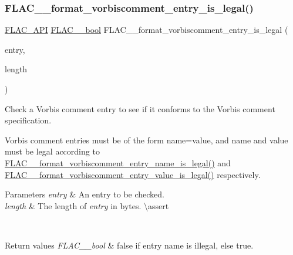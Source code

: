 \subsubsection{\texorpdfstring{FLAC\_\_format\_vorbiscomment\_entry\_is\_legal()}{FLAC\_\_format\_vorbiscomment\_entry\_is\_legal()}}
{\footnotesize\ttfamily \mbox{\hyperlink{group__flac__export_ga56ca07df8a23310707732b1c0007d6f5}{F\+L\+A\+C\+\_\+\+A\+PI}} \mbox{\hyperlink{ordinals_8h_a95103469f1cbd78b8cf250194985b34e}{F\+L\+A\+C\+\_\+\+\_\+bool}} F\+L\+A\+C\+\_\+\+\_\+format\+\_\+vorbiscomment\+\_\+entry\+\_\+is\+\_\+legal (\begin{DoxyParamCaption}\item[{const \mbox{\hyperlink{ordinals_8h_a5eb569b12d5b047cdacada4d57924ee3}{F\+L\+A\+C\+\_\+\+\_\+byte}} $\ast$}]{entry,  }\item[{unsigned}]{length }\end{DoxyParamCaption})}

Check a Vorbis comment entry to see if it conforms to the Vorbis comment specification.

Vorbis comment entries must be of the form \textquotesingle{}name=value\textquotesingle{}, and \textquotesingle{}name\textquotesingle{} and \textquotesingle{}value\textquotesingle{} must be legal according to \mbox{\hyperlink{group__flac__format_ga14980d2e4b0ff2cdd4f22fcf8e75b54c}{F\+L\+A\+C\+\_\+\+\_\+format\+\_\+vorbiscomment\+\_\+entry\+\_\+name\+\_\+is\+\_\+legal()}} and \mbox{\hyperlink{group__flac__format_gae0707c9d46b2af02f1e145bdae331605}{F\+L\+A\+C\+\_\+\+\_\+format\+\_\+vorbiscomment\+\_\+entry\+\_\+value\+\_\+is\+\_\+legal()}} respectively.


\begin{DoxyParams}{Parameters}
{\em entry} & An entry to be checked. \\
\hline
{\em length} & The length of {\itshape entry} in bytes. \textbackslash{}assert 
\begin{DoxyCode}{1}
\end{DoxyCode}
 \\
\hline
\end{DoxyParams}

\begin{DoxyRetVals}{Return values}
{\em F\+L\+A\+C\+\_\+\+\_\+bool} & {\ttfamily false} if entry name is illegal, else {\ttfamily true}. \\
\hline
\end{DoxyRetVals}
\mbox{\label{group__flac__format_ga14980d2e4b0ff2cdd4f22fcf8e75b54c}} 
